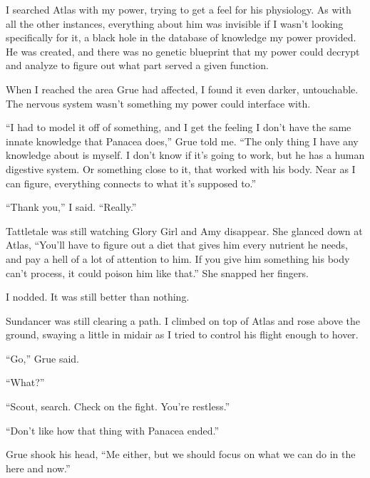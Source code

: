 I searched Atlas with my power, trying to get a feel for his physiology.  As with all the other instances, everything about him was invisible if I wasn't looking specifically for it, a black hole in the database of knowledge my power provided.  He was created, and there was no genetic blueprint that my power could decrypt and analyze to figure out what part served a given function.



When I reached the area Grue had affected, I found it even darker, untouchable.  The nervous system wasn't something my power could interface with.



``I had to model it off of something, and I get the feeling I don't have the same innate knowledge that Panacea does,'' Grue told me.  ``The only thing I have any knowledge about is myself.  I don't know if it's going to work, but he has a human digestive system.  Or something close to it, that worked with his body.  Near as I can figure, everything connects to what it's supposed to.''



``Thank you,'' I said.  ``Really.''



Tattletale was still watching Glory Girl and Amy disappear.  She glanced down at Atlas, ``You'll have to figure out a diet that gives him every nutrient he needs, and pay a hell of a lot of attention to him.  If you give him something his body can't process, it could poison him like that.''  She snapped her fingers.



I nodded.  It was still better than nothing.



Sundancer was still clearing a path.  I climbed on top of Atlas and rose above the ground, swaying a little in midair as I tried to control his flight enough to hover.



``Go,'' Grue said.



``What?''



``Scout, search.  Check on the fight.  You're restless.''



``Don't like how that thing with Panacea ended.''



Grue shook his head, ``Me either, but we should focus on what we can do in the here and now.''



